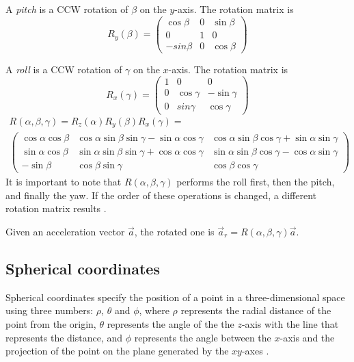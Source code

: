 A \textit{pitch} is a CCW rotation of $\beta$ on the $y$-axis. The rotation matrix is
\[
	R_y(\beta) =
	\begin{pmatrix}
		\cos\beta & 0 & \sin\beta \\
		0 & 1 & 0 \\
		-sin\beta & 0 & \cos\beta
	\end{pmatrix}
\]

A \textit{roll} is a CCW rotation of $\gamma$ on the $x$-axis. The rotation matrix is
\[
	R_x(\gamma) =
	\begin{pmatrix}
		1 & 0 & 0 \\
		0 & \cos\gamma & -\sin\gamma \\
		0 & sin\gamma & \cos\gamma
	\end{pmatrix}
\]
\begin{gather*}
	R(\alpha, \beta, \gamma) = R_z(\alpha) R_y(\beta) R_x(\gamma) = \\
	\begin{pmatrix}
		\cos\alpha \cos\beta & \cos\alpha \sin\beta \sin\gamma - \sin\alpha \cos\gamma & \cos\alpha \sin\beta \cos\gamma + \sin\alpha \sin\gamma \\
		\sin\alpha \cos\beta & \sin\alpha \sin\beta \sin\gamma + \cos\alpha \cos\gamma & \sin\alpha \sin\beta \cos\gamma - \cos\alpha \sin\gamma \\
		-\sin\beta & \cos\beta \sin\gamma & \cos\beta \cos\gamma
	\end{pmatrix}
\end{gather*}
It is important to note that $R(\alpha, \beta, \gamma)$ performs the roll first, then the pitch, and finally the yaw. If the order of these operations is changed, a different rotation matrix results \cite{Lav06}.

Given an acceleration vector $\vec a$, the rotated one is $\vec a_r = R(\alpha, \beta, \gamma) \vec a$.

\subsection{Spherical coordinates}
Spherical coordinates specify the position of a point in a three-dimensional space using three numbers: $\rho$, $\theta$ and $\phi$, where $\rho$ represents the radial distance of the point from the origin, $\theta$ represents the angle of the the $z$-axis with the line that represents the distance, and $\phi$ represents the angle between the $x$-axis and the projection of the point on the plane generated by the $xy$-axes \cite{Sok}.

